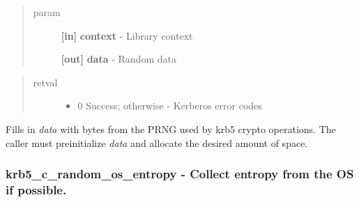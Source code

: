 \documentclass[letterpaper,10pt,english]{sphinxmanual}
\begin{document}
\begin{quote}\begin{description}
\item[{param}] \leavevmode
\textbf{{[}in{]}} \textbf{context} - Library context

\textbf{{[}out{]}} \textbf{data} - Random data

\end{description}\end{quote}
\begin{quote}\begin{description}
\item[{retval}] \leavevmode\begin{itemize}
\item {} 
0   Success; otherwise - Kerberos error codes

\end{itemize}

\end{description}\end{quote}

Fills in \emph{data} with bytes from the PRNG used by krb5 crypto operations. The caller must preinitialize \emph{data} and allocate the desired amount of space.


\subsubsection{krb5\_c\_random\_os\_entropy -  Collect entropy from the OS if possible.}
\label{appdev/refs/api/krb5_c_random_os_entropy:krb5-c-random-os-entropy-collect-entropy-from-the-os-if-possible}\label{appdev/refs/api/krb5_c_random_os_entropy::doc}

\begin{fulllineitems}
\label{appdev/refs/api/krb5_c_random_os_entropy:krb5_c_random_os_entropy}
\end{fulllineitems}
\end{document}
